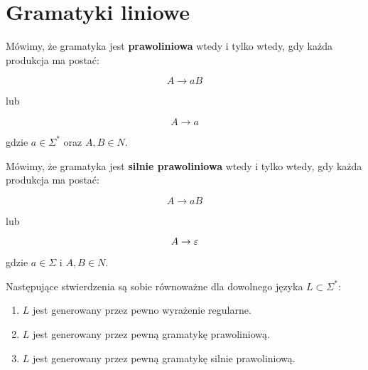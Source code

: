 \section{Gramatyki liniowe}

\begin{definition}
    Mówimy, że gramatyka jest \textbf{prawoliniowa} wtedy i tylko wtedy, gdy każda produkcja ma postać: 
    
    \[ 
        A \rightarrow aB
    \] 
    
    lub 
    
    \[ 
        A \rightarrow a 
    \]
    
    gdzie \( a \in \Sigma^* \) oraz \( A, B \in N \). 
    
\end{definition}

\begin{definition}
    Mówimy, że gramatyka jest \textbf{silnie prawoliniowa} wtedy i tylko wtedy, gdy każda produkcja ma postać: 
    
    \[ 
        A \rightarrow aB 
    \]
    
    lub 
    
    \[ 
        A \rightarrow \varepsilon 
    \]
    
    gdzie \(a \in \Sigma\) i \(A, B \in N\).
\end{definition}

\begin{theorem}
    Następujące stwierdzenia są sobie równoważne dla dowolnego języka \( L \subset \Sigma^* \):
    
    \begin{enumerate}
        \item \(L\) jest generowany przez pewno wyrażenie regularne.
        \item \(L\) jest generowany przez pewną gramatykę prawoliniową.
        \item \(L\) jest generowany przez pewną gramatykę silnie prawoliniową. 
    \end{enumerate}
\end{theorem}


